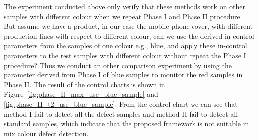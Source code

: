 The experiment conducted above only verify that these methods work on other samples with different colour when we repeat Phase I and Phase II procedure. But assume we have a product, in our case the mobile phone cover, with different production lines with respect to different colour, can we use the derived in-control parameters from the samples of one colour e.g., blue, and apply these in-control parameters to the rest samples with different colour without repeat the Phase I procedure? Thus we conduct an other comparison experiment by using the parameter derived from Phase I of blue samples to monitor the red samples in Phase II. The result of the control charts is shown in Figure~\ref{fig:phase_II_max_use_blue_sample} and \ref{fig:phase_II_t2_use_blue_sample}. From the control chart we can see that method I fail to detect all the defect samples and method II fail to detect all standard samples, which indicate that the proposed framework is not suitable in mix colour defect detection.


